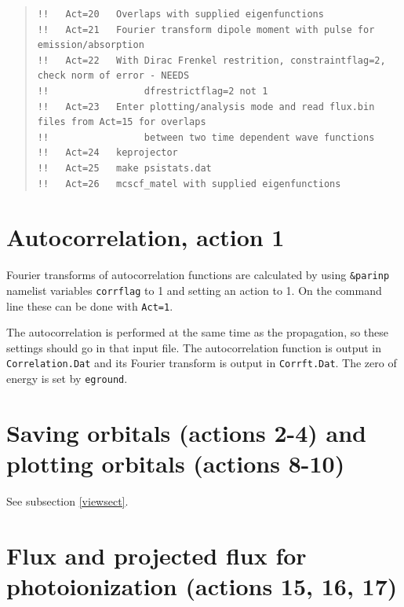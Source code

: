 \documentclass[10pt,leqno, oneside]{book}
\begin{document}
\begin{quote}
{\begin{verbatim}
!!   Act=20   Overlaps with supplied eigenfunctions                                                                                      
!!   Act=21   Fourier transform dipole moment with pulse for emission/absorption                                                         
!!   Act=22   With Dirac Frenkel restrition, constraintflag=2, check norm of error - NEEDS                                               
!!                 dfrestrictflag=2 not 1                                                                                                
!!   Act=23   Enter plotting/analysis mode and read flux.bin files from Act=15 for overlaps                                              
!!                 between two time dependent wave functions                                                                             
!!   Act=24   keprojector  
!!   Act=25   make psistats.dat
!!   Act=26   mcscf_matel with supplied eigenfunctions 
\end{verbatim}}
\end{quote}


\section{Autocorrelation, action 1}

Fourier transforms of autocorrelation functions are calculated by using \verb#&parinp# namelist variables \verb#corrflag# to 1 and setting an action to 1.  On the command line these can be done with \verb#Act=1#.   

The autocorrelation is performed at the same time as the propagation, so these settings should go in that input file.
 The autocorrelation function is output in \verb#Correlation.Dat# and its Fourier transform is output in \verb#Corrft.Dat#.  The zero of energy is set by \verb#eground#.

\section{Saving orbitals (actions 2-4) and plotting orbitals (actions 8-10)}


See subsection \ref{viewsect}.


\section{Flux and projected flux for photoionization (actions 15, 16, 17)}
\end{document}
